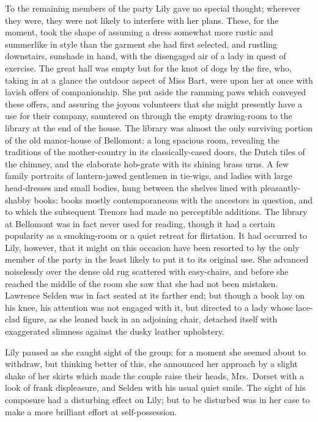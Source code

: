 \documentclass[12pt,a4paper]{book}
\begin{document}
To the remaining members of the party Lily gave no special
thought; wherever they were, they were not likely to interfere
with her plans. These, for the moment, took the shape of assuming
a dress somewhat more rustic and summerlike in style than the
garment she had first selected, and rustling downstairs,
sunshade in hand, with the disengaged air of a lady in quest of
exercise. The great hall was empty but for the knot of dogs by
the fire, who, taking in at a glance the outdoor aspect of Miss
Bart, were upon her at once with lavish offers of companionship. 
She put aside the ramming paws which conveyed these offers, and
assuring the joyous volunteers that she might presently have a
use for their company, sauntered on through the empty
drawing-room to the library at the end of the house. The library
was almost the only surviving portion of the old manor-house of
Bellomont: a long spacious room, revealing the traditions of the
mother-country in its classically-cased doors, the Dutch tiles of
the chimney, and the elaborate hob-grate with its shining brass
urns. A few family portraits of lantern-jawed gentlemen in
tie-wigs, and ladies with large head-dresses and small bodies,
hung between the shelves lined with pleasantly-shabby books: 
books mostly contemporaneous with the ancestors in question, and
to which the subsequent Trenors had made no perceptible
additions. The library at Bellomont was in fact never used for
reading, though it had a certain popularity as a smoking-room or
a quiet retreat for flirtation. It had occurred to Lily, however,
that it might on this occasion have been resorted to by the only
member of the party in the least likely to put it to its original
use. She advanced noiselessly over the dense old rug scattered
with easy-chairs, and before she reached the middle of the room
she saw that she had not been mistaken. Lawrence Selden was in
fact seated at its farther end; but though a book lay on his
knee, his attention was not engaged with it, but directed to a
lady whose lace-clad figure, as she leaned back in an adjoining
chair, detached itself with exaggerated slimness against the
dusky leather upholstery.





Lily paused as she caught sight of the group; for a moment she
seemed about to withdraw, but thinking better of this, she
announced her approach by a slight shake of her skirts which made
the couple raise their heads, Mrs.\ Dorset with a look of frank
displeasure, and Selden with his usual quiet smile. The sight of
his composure had a disturbing effect on Lily; but to be
disturbed was in her case to make a more brilliant effort at
self-possession.
\end{document}
